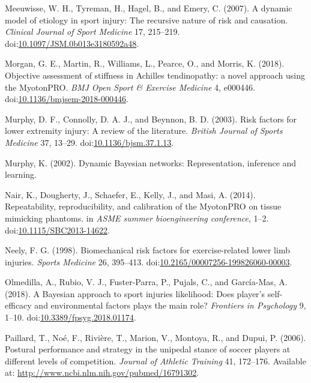 \documentclass[
  english,
  man,floatsintext]{apa6}
\newlength{\cslhangindent}
\newenvironment{cslreferences}%
  {\setlength{\parindent}{0pt}%
  \everypar{\setlength{\hangindent}{\cslhangindent}}\ignorespaces}%
  {\par}
\begin{document}
\begin{cslreferences}
\leavevmode\hypertarget{ref-Meeuwisse2007}{}%
Meeuwisse, W. H., Tyreman, H., Hagel, B., and Emery, C. (2007). A dynamic model of etiology in sport injury: The recursive nature of risk and causation. \emph{Clinical Journal of Sport Medicine} 17, 215--219. doi:\href{https://doi.org/10.1097/JSM.0b013e3180592a48}{10.1097/JSM.0b013e3180592a48}.

\leavevmode\hypertarget{ref-Morgan2018}{}%
Morgan, G. E., Martin, R., Williams, L., Pearce, O., and Morris, K. (2018). Objective assessment of stiffness in Achilles tendinopathy: a novel approach using the MyotonPRO. \emph{BMJ Open Sport \& Exercise Medicine} 4, e000446. doi:\href{https://doi.org/10.1136/bmjsem-2018-000446}{10.1136/bmjsem-2018-000446}.

\leavevmode\hypertarget{ref-Murphy2003}{}%
Murphy, D. F., Connolly, D. A. J., and Beynnon, B. D. (2003). Risk factors for lower extremity injury: A review of the literature. \emph{British Journal of Sports Medicine} 37, 13--29. doi:\href{https://doi.org/10.1136/bjsm.37.1.13}{10.1136/bjsm.37.1.13}.

\leavevmode\hypertarget{ref-Murphy2002}{}%
Murphy, K. (2002). Dynamic Bayesian networks: Representation, inference and learning.

\leavevmode\hypertarget{ref-Nair2014}{}%
Nair, K., Dougherty, J., Schaefer, E., Kelly, J., and Masi, A. (2014). Repeatability, reproducibility, and calibration of the MyotonPRO on tissue mimicking phantoms. in \emph{ASME summer bioengineering conference}, 1--2. doi:\href{https://doi.org/10.1115/SBC2013-14622}{10.1115/SBC2013-14622}.

\leavevmode\hypertarget{ref-Neely1998}{}%
Neely, F. G. (1998). Biomechanical risk factors for exercise-related lower limb injuries. \emph{Sports Medicine} 26, 395--413. doi:\href{https://doi.org/10.2165/00007256-199826060-00003}{10.2165/00007256-199826060-00003}.

\leavevmode\hypertarget{ref-Olmedilla2018}{}%
Olmedilla, A., Rubio, V. J., Fuster-Parra, P., Pujals, C., and García-Mas, A. (2018). A Bayesian approach to sport injuries likelihood: Does player's self-efficacy and environmental factors plays the main role? \emph{Frontiers in Psychology} 9, 1--10. doi:\href{https://doi.org/10.3389/fpsyg.2018.01174}{10.3389/fpsyg.2018.01174}.

\leavevmode\hypertarget{ref-Paillard2006}{}%
Paillard, T., Noé, F., Rivière, T., Marion, V., Montoya, R., and Dupui, P. (2006). Postural performance and strategy in the unipedal stance of soccer players at different levels of competition. \emph{Journal of Athletic Training} 41, 172--176. Available at: \url{http://www.ncbi.nlm.nih.gov/pubmed/16791302}.


\end{cslreferences}
\end{document}
